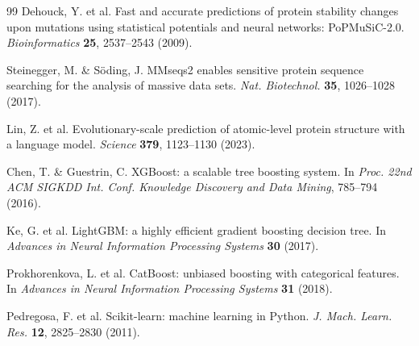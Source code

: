 \documentclass[sn-nature]{sn-jnl}%
\begin{document}
\begin{thebibliography}{99}
Dehouck, Y. et al. Fast and accurate predictions of protein stability changes upon mutations
using statistical potentials and neural networks: PoPMuSiC-2.0. \textit{Bioinformatics}
\textbf{25}, 2537--2543 (2009).

Steinegger, M. \& S\"oding, J. MMseqs2 enables sensitive protein sequence searching for the
analysis of massive data sets. \textit{Nat. Biotechnol.} \textbf{35}, 1026--1028 (2017).

Lin, Z. et al. Evolutionary-scale prediction of atomic-level protein structure with a language
model. \textit{Science} \textbf{379}, 1123--1130 (2023).

Chen, T. \& Guestrin, C. XGBoost: a scalable tree boosting system. In \textit{Proc. 22nd ACM
SIGKDD Int. Conf. Knowledge Discovery and Data Mining}, 785--794 (2016).

Ke, G. et al. LightGBM: a highly efficient gradient boosting decision tree. In \textit{Advances
in Neural Information Processing Systems} \textbf{30} (2017).

Prokhorenkova, L. et al. CatBoost: unbiased boosting with categorical features. In
\textit{Advances in Neural Information Processing Systems} \textbf{31} (2018).

Pedregosa, F. et al. Scikit-learn: machine learning in Python. \textit{J. Mach. Learn. Res.}
\textbf{12}, 2825--2830 (2011).

\end{thebibliography}
\end{document}
